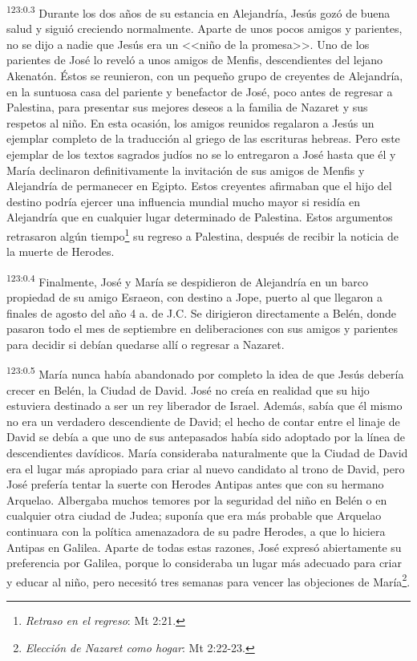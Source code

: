 \par 
\textsuperscript{123:0.3} Durante los dos años de su estancia en Alejandría, Jesús gozó de buena salud y siguió creciendo normalmente. Aparte de unos pocos amigos y parientes, no se dijo a nadie que Jesús era un <<niño de la promesa>>. Uno de los parientes de José lo reveló a unos amigos de Menfis, descendientes del lejano Akenatón. Éstos se reunieron, con un pequeño grupo de creyentes de Alejandría, en la suntuosa casa del pariente y benefactor de José, poco antes de regresar a Palestina, para presentar sus mejores deseos a la familia de Nazaret y sus respetos al niño. En esta ocasión, los amigos reunidos regalaron a Jesús un ejemplar completo de la traducción al griego de las escrituras hebreas. Pero este ejemplar de los textos sagrados judíos no se lo entregaron a José hasta que él y María declinaron definitivamente la invitación de sus amigos de Menfis y Alejandría de permanecer en Egipto. Estos creyentes afirmaban que el hijo del destino podría ejercer una influencia mundial mucho mayor si residía en Alejandría que en cualquier lugar determinado de Palestina. Estos argumentos retrasaron algún tiempo\footnote{\textit{Retraso en el regreso}: Mt 2:21.} su regreso a Palestina, después de recibir la noticia de la muerte de Herodes.

\par 
\textsuperscript{123:0.4} Finalmente, José y María se despidieron de Alejandría en un barco propiedad de su amigo Esraeon, con destino a Jope, puerto al que llegaron a finales de agosto del año 4 a. de J.C. Se dirigieron directamente a Belén, donde pasaron todo el mes de septiembre en deliberaciones con sus amigos y parientes para decidir si debían quedarse allí o regresar a Nazaret.

\par 
\textsuperscript{123:0.5} María nunca había abandonado por completo la idea de que Jesús debería crecer en Belén, la Ciudad de David. José no creía en realidad que su hijo estuviera destinado a ser un rey liberador de Israel. Además, sabía que él mismo no era un verdadero descendiente de David; el hecho de contar entre el linaje de David se debía a que uno de sus antepasados había sido adoptado por la línea de descendientes davídicos. María consideraba naturalmente que la Ciudad de David era el lugar más apropiado para criar al nuevo candidato al trono de David, pero José prefería tentar la suerte con Herodes Antipas antes que con su hermano Arquelao. Albergaba muchos temores por la seguridad del niño en Belén o en cualquier otra ciudad de Judea; suponía que era más probable que Arquelao continuara con la política amenazadora de su padre Herodes, a que lo hiciera Antipas en Galilea. Aparte de todas estas razones, José expresó abiertamente su preferencia por Galilea, porque lo consideraba un lugar más adecuado para criar y educar al niño, pero necesitó tres semanas para vencer las objeciones de María\footnote{\textit{Elección de Nazaret como hogar}: Mt 2:22-23.}.

